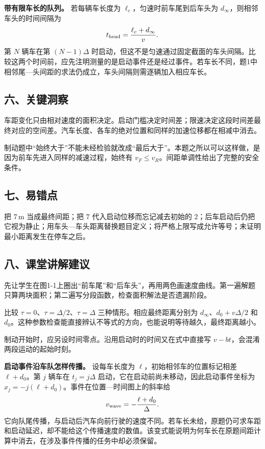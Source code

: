 \documentclass[12pt,a4paper,UTF8]{ctexart}
\begin{document}
\textbf{带有限车长的队列。} 若每辆车长度为
\(\ell_c\)，匀速时前车尾到后车头为 \(d_\infty\)，则相邻车头的时间间隔为
\[
t_{\rm head}=\frac{\ell_c+d_\infty}{v}.
\] 第 \(N\) 辆车在第 \((N-1)\Delta\)
时启动，但这不是匀速通过固定截面的车头间隔。比较这两个时间前，应先注明测量的是启动事件还是经过事件。若车长不同，题1中相邻尾---头间距的求法仍成立，车头间隔则需逐辆加入相应车长。

\subsection{六、关键洞察}\label{ux516dux5173ux952eux6d1eux5bdf}

车距变化只由相对速度的面积决定。启动门槛决定时间差；限速决定这段时间差最终对应的空间差。汽车长度、各车的绝对位置和同样的加速位移都在相减中消去。

制动题中``始终大于''不能未经检验就改成``最后大于''。本题之所以可以这样做，是因为前车先进入同样的减速过程，始终有
\(v_F\le v_R\)。间距单调性给出了完整的安全条件。

\subsection{七、易错点}\label{ux4e03ux6613ux9519ux70b9}

把 \(7\,\mathrm m\) 当成最终间距；把 \(7\) 代入启动位移而忘记减去初始的
\(2\)；后车启动后仍把它视为静止；用车头---车头距离替换题目定义；将严格上限写成允许等号；未证明最小距离发生在停车之后。

\subsection{八、课堂讲解建议}\label{ux516bux8bfeux5802ux8bb2ux89e3ux5efaux8bae}

先让学生在图1-1上圈出``前车尾''和``后车头''，再用两色画速度曲线。第一遍解题只算两块面积；第二遍写分段函数，检查面积解法是否遗漏阶段。

比较 \(\tau=0\)、\(\tau=\Delta/2\)、\(\tau=\Delta\)
三种情形。相应最终距离分别为 \(d_\infty\)、\(d_0+v\Delta/2\) 和
\(d_0\)。这种参数检查能直接辨认不等式的方向，也能说明等待越久，最终距离越小。

制动开始时，应另设时间零点。沿用启动时的时间又在式中直接写
\(v-bt\)，会混淆两段运动的起始时刻。

\textbf{启动事件沿车队怎样传播。} 设每车长度为
\(\ell\)，初始相邻车的位置标记相差 \(\ell+d_0\)。第 \(j\) 辆车在
\(t_j=j\Delta\) 启动，它在启动前尚未移动，因此启动事件坐标为
\(x_j=-j(\ell+d_0)\)。事件在位置---时间图上的斜率给 \[
v_{\rm wave}=-\frac{\ell+d_0}{\Delta}.
\]
它向队尾传播，与启动后汽车向前行驶的速度不同。若车长未给，原题仍可求车距和启动延迟，却不能给这个传播速度的数值。该变式能说明为何车长在原题间距计算中消去，在涉及事件传播的任务中却必须保留。
\end{document}
